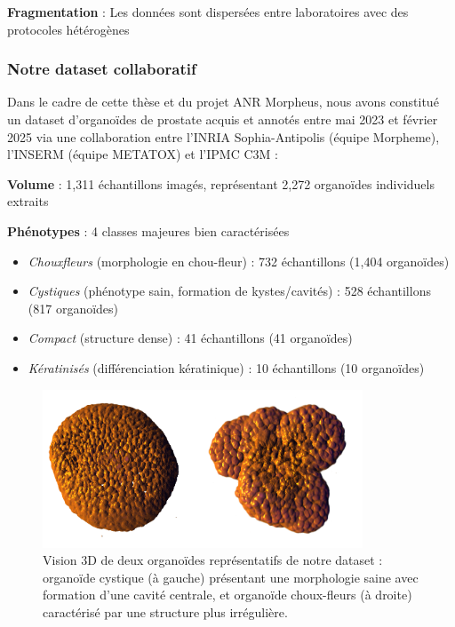 \textbf{Fragmentation} : Les données sont dispersées entre laboratoires avec des protocoles hétérogènes


\subsubsection{Notre dataset collaboratif}

Dans le cadre de cette thèse et du projet ANR Morpheus, nous avons constitué un dataset d'organoïdes de prostate acquis et annotés entre mai 2023 et février 2025 via une collaboration entre l'INRIA Sophia-Antipolis (équipe Morpheme), l'INSERM (équipe METATOX) et l'IPMC C3M :

\textbf{Volume} : 1,311 échantillons imagés, représentant 2,272 organoïdes individuels extraits

\textbf{Phénotypes} : 4 classes majeures bien caractérisées
        \begin{itemize}
            \item \textit{Chouxfleurs} (morphologie en chou-fleur) : 732 échantillons (1,404 organoïdes)
            \item \textit{Cystiques} (phénotype sain, formation de kystes/cavités) : 528 échantillons (817 organoïdes)
            \item \textit{Compact} (structure dense) : 41 échantillons (41 organoïdes)
            \item \textit{Kératinisés} (différenciation kératinique) : 10 échantillons (10 organoïdes)
        \end{itemize}

\begin{figure}[htbp]
    \centering
    \includegraphics[width=0.85\textwidth]{../img/3Dviz.png}
    \caption{Vision 3D de deux organoïdes représentatifs de notre dataset : organoïde cystique (à gauche) présentant une morphologie saine avec formation d'une cavité centrale, et organoïde choux-fleurs (à droite) caractérisé par une structure plus irrégulière.}
    \label{fig:3Dviz}
\end{figure}

